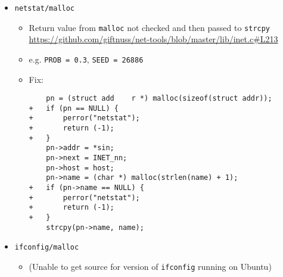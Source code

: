 \begin{itemize}
\item \texttt{netstat/malloc}
\begin{itemize}
\item Return value from \texttt{malloc} not checked and then passed to \texttt{strcpy}
\url{https://github.com/giftnuss/net-tools/blob/master/lib/inet.c#L213}
\item e.g. \texttt{PROB = 0.3}, \texttt{SEED = 26886}
\item Fix:
\begin{lstlisting}
    pn = (struct add	r *) malloc(sizeof(struct addr));
+   if (pn == NULL) {
+   	perror("netstat");
+		return (-1);
+   }
    pn->addr = *sin;
    pn->next = INET_nn;
    pn->host = host;
    pn->name = (char *) malloc(strlen(name) + 1);
+   if (pn->name == NULL) {
+   	perror("netstat");
+		return (-1);
+   }
    strcpy(pn->name, name);

\end{lstlisting}
\end{itemize}

\item \texttt{ifconfig/malloc}
\begin{itemize}
\item (Unable to get source for version of \texttt{ifconfig} running on Ubuntu)\\
\end{itemize}


\end{itemize}
